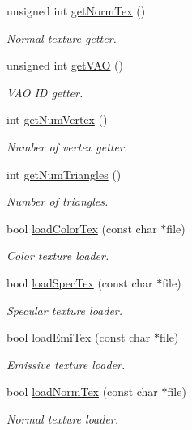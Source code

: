 \begin{DoxyCompactItemize}
unsigned int \hyperlink{class_mesh_a8b60518f329c4e3d15824ef68c794fa1}{get\+Norm\+Tex} ()
\begin{DoxyCompactList}\small\item\em Normal texture getter. \end{DoxyCompactList}\item 
unsigned int \hyperlink{class_mesh_add2e2bafe60711ec9f67308c140640a9}{get\+V\+A\+O} ()
\begin{DoxyCompactList}\small\item\em V\+A\+O I\+D getter. \end{DoxyCompactList}\item 
int \hyperlink{class_mesh_ae4163571bceed9d224fc43e943dda118}{get\+Num\+Vertex} ()
\begin{DoxyCompactList}\small\item\em Number of vertex getter. \end{DoxyCompactList}\item 
int \hyperlink{class_mesh_a4452aed4ac63ff0639b839bba095347e}{get\+Num\+Triangles} ()
\begin{DoxyCompactList}\small\item\em Number of triangles. \end{DoxyCompactList}\item 
bool \hyperlink{class_mesh_ac06b928f547c1eec3b66ae5503608c21}{load\+Color\+Tex} (const char $\ast$file)
\begin{DoxyCompactList}\small\item\em Color texture loader. \end{DoxyCompactList}\item 
bool \hyperlink{class_mesh_ada437d0826057661de46ab5ce2b497a4}{load\+Spec\+Tex} (const char $\ast$file)
\begin{DoxyCompactList}\small\item\em Specular texture loader. \end{DoxyCompactList}\item 
bool \hyperlink{class_mesh_abb21ce55711b89f7018d103b50294f69}{load\+Emi\+Tex} (const char $\ast$file)
\begin{DoxyCompactList}\small\item\em Emissive texture loader. \end{DoxyCompactList}\item 
bool \hyperlink{class_mesh_a443b1a0a0c36ff911f58f2a5f4616538}{load\+Norm\+Tex} (const char $\ast$file)
\begin{DoxyCompactList}\small\item\em Normal texture loader. \end{DoxyCompactList}\item 

\end{DoxyCompactItemize}
